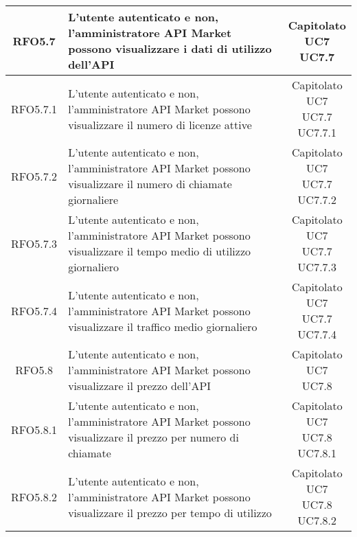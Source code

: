 \begin{longtable}{|c|p{8cm}|c|}
RFO5.7 & L'utente autenticato e non, l'amministratore API Market possono visualizzare i dati di utilizzo dell'API & \makecell*{Capitolato\\UC7\\UC7.7} \\
\hline

RFO5.7.1 &  L'utente autenticato e non, l'amministratore API Market possono visualizzare il numero di licenze attive & \makecell*{Capitolato\\UC7\\UC7.7\\UC7.7.1} \\
\hline

RFO5.7.2 &  L'utente autenticato e non, l'amministratore API Market possono visualizzare il numero di chiamate giornaliere & \makecell*{Capitolato\\UC7\\UC7.7\\UC7.7.2} \\
\hline
RFO5.7.3 &  L'utente autenticato e non, l'amministratore API Market possono visualizzare il tempo medio di utilizzo giornaliero & \makecell*{Capitolato\\UC7\\UC7.7\\UC7.7.3} \\
\hline
RFO5.7.4 &  L'utente autenticato e non, l'amministratore API Market possono visualizzare il traffico medio giornaliero & \makecell*{Capitolato\\UC7\\UC7.7\\UC7.7.4} \\
\hline

RFO5.8 & L'utente autenticato e non, l'amministratore API Market possono visualizzare il prezzo dell'API & \makecell*{Capitolato\\UC7\\UC7.8} \\
\hline

RFO5.8.1 &  L'utente autenticato e non, l'amministratore API Market possono visualizzare il prezzo per numero di chiamate & \makecell*{Capitolato\\UC7\\UC7.8\\UC7.8.1} \\
\hline

RFO5.8.2 &  L'utente autenticato e non, l'amministratore API Market possono visualizzare il prezzo per tempo di utilizzo & \makecell*{Capitolato\\UC7\\UC7.8\\UC7.8.2} \\
\hline


\end{longtable}
